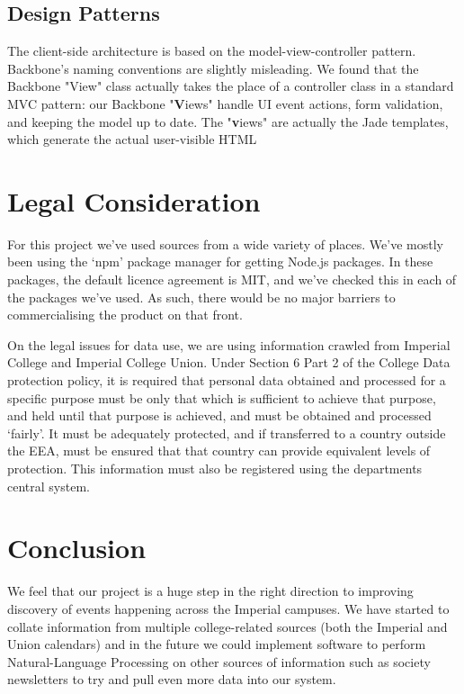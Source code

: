 \documentclass[11pt]{article}
\begin{document}
\subsection{Design Patterns}

The client-side architecture is based on the model-view-controller pattern. Backbone's naming conventions are slightly misleading. We found that the Backbone "View" class actually takes the place of a controller class in a standard MVC pattern: our Backbone "\textbf{V}iews" handle UI event actions, form validation, and keeping the model up to date. The "\textbf{v}iews" are actually the Jade templates, which generate the actual user-visible HTML 

\section {Legal Consideration}

For this project we've used sources from a wide variety of places. We've mostly been using the `npm' package manager for getting Node.js packages. In these packages, the default licence agreement is MIT, and we've checked this in each of the packages we've used. As such, there would be no major barriers to commercialising the product on that front.

On the legal issues for data use, we are using information crawled from Imperial College and Imperial College Union. Under Section 6 Part 2 of the College Data protection policy, it is required that personal data obtained and processed for a specific purpose must be only that which is sufficient to achieve that purpose, and held until that purpose is achieved, and must be obtained and processed `fairly'. It must be adequately protected, and if transferred to a country outside the EEA, must be ensured that that country can provide equivalent levels of protection. This information must also be registered using the departments central system.

\section {Conclusion}
We feel that our project is a huge step in the right direction to improving discovery of events happening across the Imperial campuses. We have started to collate information from multiple college-related sources (both the Imperial and Union calendars) and in the future we could implement software to perform Natural-Language Processing on other sources of information such as society newsletters to try and pull even more data into our system.
\end{document}
